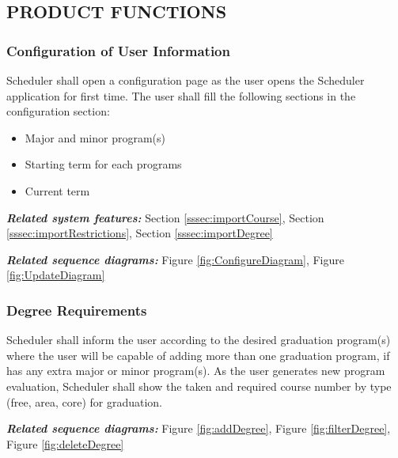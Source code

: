 \documentclass[twoside,letterpaper]{article}
\begin{document}
\subsection[PRODUCT
FUNCTIONS]{\rmfamily\bfseries\color{black}
PRODUCT FUNCTIONS}

\subsubsection[Configuration of User Information
]{\rmfamily\bfseries\color{black}
Configuration of User Information}

{\color{black}
Scheduler shall open a configuration page as the user opens the Scheduler application for first time. The user shall fill the following sections in the configuration section:}

\begin{itemize}
			\item Major and minor program(s)
			\item Starting term for each programs
			\item Current term	
		\end{itemize}
	
\smallskip

{\color{black}
\emph{\textbf{Related system features:}} Section \ref{sssec:importCourse}, Section \ref{sssec:importRestrictions}, Section \ref{sssec:importDegree}}

\smallskip

{\color{black}
\emph{\textbf{Related sequence diagrams:}} Figure \ref{fig:ConfigureDiagram}, Figure \ref{fig:UpdateDiagram}}

\subsubsection[Degree Requirements
]{\rmfamily\bfseries\color{black}
	Degree Requirements}

{\color{black}
	Scheduler shall inform the user according to the desired graduation program(s) where the user will be capable of adding more than one graduation program, if has any extra major or minor program(s). As the user generates new program evaluation, Scheduler shall show the taken and required course number by type (free, area, core) for graduation.}

\smallskip

{\color{black}
\emph{\textbf{Related sequence diagrams:}} Figure \ref{fig:addDegree}, Figure \ref{fig:filterDegree}, Figure \ref{fig:deleteDegree}}
\end{document}
